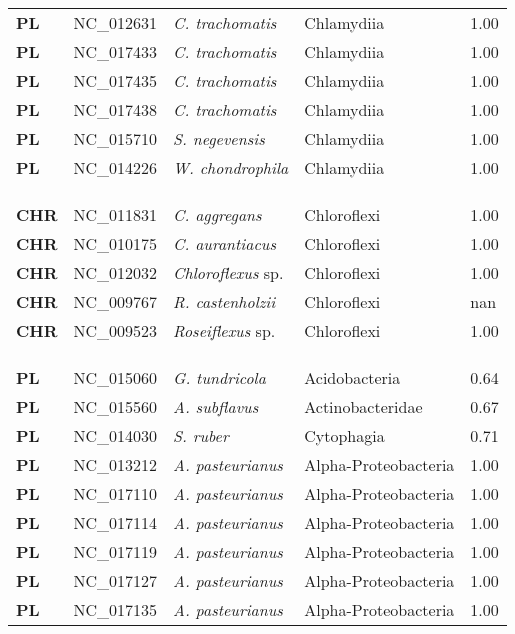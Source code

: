 \begin{adjustwidth}{-3cm}{2cm}
{\begin{supertabular}{>{\bfseries}l|p{0.1\textwidth}p{0.14\textwidth}l|l}
PL & NC\_012631 & \textit{C. trachomatis} & Chlamydiia & 1.00\\
PL & NC\_017433 & \textit{C. trachomatis} & Chlamydiia & 1.00\\
PL & NC\_017435 & \textit{C. trachomatis} & Chlamydiia & 1.00\\
PL & NC\_017438 & \textit{C. trachomatis} & Chlamydiia & 1.00\\
PL & NC\_015710 & \textit{S. negevensis} & Chlamydiia & 1.00\\
PL & NC\_014226 & \textit{W. chondrophila} & Chlamydiia & 1.00\\
\\
\\
\hline\\
CHR & NC\_011831 & \textit{C. aggregans} & Chloroflexi & 1.00\\
CHR & NC\_010175 & \textit{C. aurantiacus} & Chloroflexi & 1.00\\
CHR & NC\_012032 & \textit{Chloroflexus} sp. & Chloroflexi & 1.00\\
CHR & NC\_009767 & \textit{R. castenholzii} & Chloroflexi & nan\\
CHR & NC\_009523 & \textit{Roseiflexus} sp. & Chloroflexi & 1.00\\
\\
\\
\hline\\
PL & NC\_015060 & \textit{G. tundricola} & Acidobacteria & 0.64\\
PL & NC\_015560 & \textit{A. subflavus} & Actinobacteridae & 0.67\\
PL & NC\_014030 & \textit{S. ruber} & Cytophagia & 0.71\\
PL & NC\_013212 & \textit{A. pasteurianus} & Alpha-Proteobacteria & 1.00\\
PL & NC\_017110 & \textit{A. pasteurianus} & Alpha-Proteobacteria & 1.00\\
PL & NC\_017114 & \textit{A. pasteurianus} & Alpha-Proteobacteria & 1.00\\
PL & NC\_017119 & \textit{A. pasteurianus} & Alpha-Proteobacteria & 1.00\\
PL & NC\_017127 & \textit{A. pasteurianus} & Alpha-Proteobacteria & 1.00\\
PL & NC\_017135 & \textit{A. pasteurianus} & Alpha-Proteobacteria & 1.00\\

\end{supertabular}}
\end{adjustwidth}
